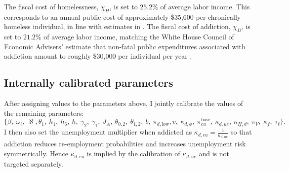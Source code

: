 \documentclass[parskip=full]{article}
\theoremstyle{plain}
\theoremstyle{definition}
\theoremstyle{remark}
\begin{document}
The fiscal cost of homelessness, $\chi_H$, is set to $25.2\%$ of average labor income. This corresponds to an annual public cost of approximately \$35{,}600 per chronically homeless individual, in line with estimates in \citet{naeh2016saves}. The fiscal cost of addiction, $\chi_D$, is set to $21.2\%$ of average labor income, matching the White House Council of Economic Advisers' estimate that non-fatal public expenditures associated with addiction amount to roughly \$30{,}000 per individual per year \citep{cea2017opioid}.

\subsection{Internally calibrated parameters}
\label{sec:internal_calibration}

After assigning values to the parameters above, I jointly calibrate the values of the remaining parameters:
\[\Big\{\beta,\ \omega_\ell,\ \aleph, \theta_1,\ h_1,\ h_{6},\ \underline h,\ \gamma_2,\ \gamma_1,\ J_{A},\ \theta_{0,2},\ \theta_{1,2},\ b,\ \pi_{d,\text{low}},\overline{v} ,\ \kappa_{d,\phi},\ \pi_{eu}^{\text{base}},\ \kappa_{d,ue},\ \kappa_{\underline H,d},\ \pi_{V},\ \kappa_{f},\ \tau_{\ell} \Big\}.\]
I then also set the unemployment multiplier when addicted as
$\kappa_{d,eu}=\frac{1}{\kappa_{d,ue}}$ so that addiction reduces re-employment probabilities and increases unemployment risk symmetrically. Hence $\kappa_{d,eu}$ is implied by the calibration of $\kappa_{d,ue}$ and is not targeted separately.
\end{document}
